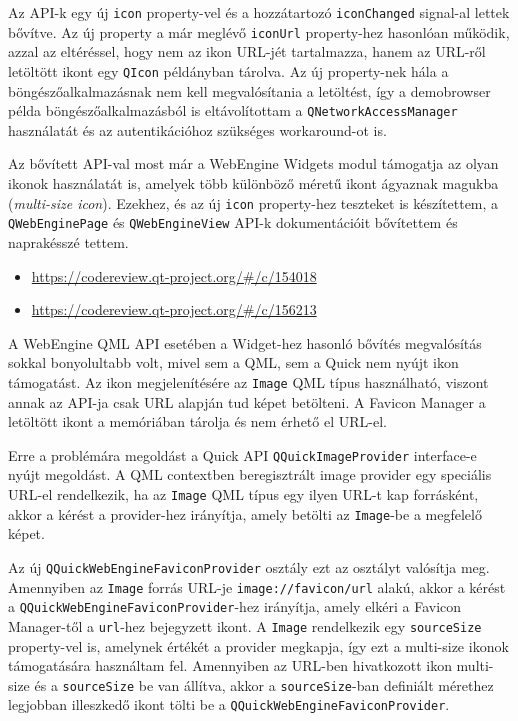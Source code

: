\documentclass[12pt]{report}
\let\origurl\url
\renewcommand{\url}[1]{%
    \textcolor{blue}{\origurl{#1}}
}
\newcommand{\gerrit}[1]{%
    \textcolor{qtgreen}{\origurl{https://codereview.qt-project.org/\#/c/#1}}
}
\begin{document}
Az API-k egy új \texttt{icon} property-vel és a hozzátartozó \texttt{iconChanged} signal-al
lettek bővítve. Az új property a már meglévő \texttt{iconUrl} property-hez hasonlóan működik,
azzal az eltéréssel, hogy nem az ikon URL-jét tartalmazza, hanem az URL-ről letöltött ikont
egy \texttt{QIcon} példányban tárolva. Az új property-nek hála a böngészőalkalmazásnak nem
kell megvalósítania a letöltést, így a demobrowser példa böngészőalkalmazásból is
eltávolítottam a \texttt{QNetworkAccessManager} használatát és az autentikációhoz szükséges
workaround-ot is.

Az bővített API-val most már a WebEngine Widgets modul támogatja az olyan ikonok használatát
is, amelyek több különböző méretű ikont ágyaznak magukba (\textit{multi-size icon}).
Ezekhez, és az új \texttt{icon} property-hez teszteket is készítettem,
a \texttt{QWebEnginePage} és \texttt{QWebEngineView} API-k dokumentációit bővítettem és
naprakésszé tettem.

\begin{center}
    \begin{reviewbox}
        \begin{itemize}
            \renewcommand{\labelitemi}{\textcolor{qtgreen}{$\blacktriangleright$}}
            \item \gerrit{154018}
            \item \gerrit{156213}
        \end{itemize}
    \end{reviewbox}
\end{center}

A WebEngine QML API esetében a Widget-hez hasonló bővítés megvalósítás sokkal bonyolultabb
volt, mivel sem a QML, sem a Quick nem nyújt ikon támogatást. Az ikon megjelenítésére az
\texttt{Image} QML típus használható, viszont annak az API-ja csak URL alapján tud képet
betölteni. A Favicon Manager a letöltött ikont a memóriában tárolja és nem érhető el URL-el.

Erre a problémára megoldást a Quick API \texttt{QQuickImageProvider} interface-e nyújt
megoldást. A QML contextben beregisztrált image provider egy speciális URL-el rendelkezik,
ha az \texttt{Image} QML típus egy ilyen URL-t kap forrásként, akkor a kérést a provider-hez
irányítja, amely betölti az \texttt{Image}-be a megfelelő képet.

Az új \texttt{QQuickWebEngineFaviconProvider} osztály ezt az osztályt valósítja meg.
Amennyiben az \texttt{Image} forrás URL-je \texttt{image://favicon/url} alakú, akkor a
kérést a \texttt{QQuickWebEngineFaviconProvider}-hez irányítja, amely elkéri a
Favicon Manager-től a \texttt{url}-hez bejegyzett ikont. A \texttt{Image} rendelkezik
egy \texttt{sourceSize} property-vel is, amelynek értékét a provider megkapja, így ezt a
multi-size ikonok támogatására használtam fel. Amennyiben az URL-ben hivatkozott ikon
multi-size és a \texttt{sourceSize} be van állítva, akkor a \texttt{sourceSize}-ban definiált
mérethez legjobban illeszkedő ikont tölti be a \texttt{QQuickWebEngineFaviconProvider}.
\end{document}
